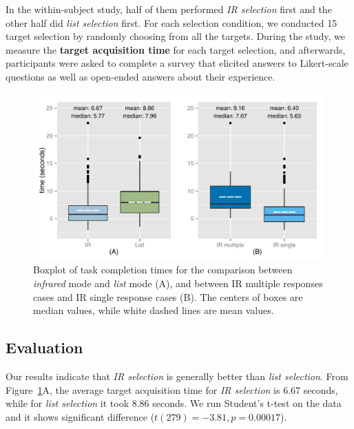In the within-subject study, half of them performed {\em IR selection} first and the other half did {\em list selection} first. For each selection condition, we conducted 15 target selection by randomly choosing from all the targets. During the study, we measure the {\bf target acquisition time} for each target selection, and afterwards, participants were asked to complete a survey that elicited answers to Likert-scale questions as well as open-ended answers about their experience.


\begin{figure}[t]
\centering
\includegraphics[width=1.0\columnwidth]{figures/R_time_by_Category.pdf}
\caption{Boxplot of task completion times for the comparison between {\em infrared} mode and {\em list} mode (A), and between IR multiple responses cases and IR single response cases (B). The centers of boxes are median values, while white dashed lines are mean values.}
\label{fig:selection-time}
\end{figure}

\subsection{Evaluation}
Our results indicate that {\em IR selection} is generally better than {\em list selection}. From Figure~\ref{fig:selection-time}A, the average target acquisition time for {\em IR selection} is 6.67 seconds, while for {\em list selection} it took 8.86 seconds. We run Student's t-test on the data and it shows significant difference ($t(279)=-3.81, p=0.00017$).

